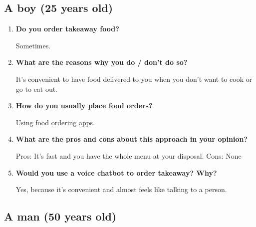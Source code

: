 \subsection*{A boy (25 years old)}

\begin{enumerate}

\item \textbf{Do you order takeaway food?}

Sometimes.

\item \textbf{What are the reasons why you do / don't do so?}

It's convenient to have food delivered to you when you don't want to cook or go to eat out.

\item \textbf{How do you usually place food orders?}

Using food ordering apps.

\item \textbf{What are the pros and cons about this approach in your opinion?}

Pros: It's fast and you have the whole menu at your disposal.
Cons: None

\item \textbf{Would you use a voice chatbot to order takeaway? Why?}

Yes, because it's convenient and almost feels like talking to a person.

\end{enumerate}


\subsection*{A man (50 years old)}

